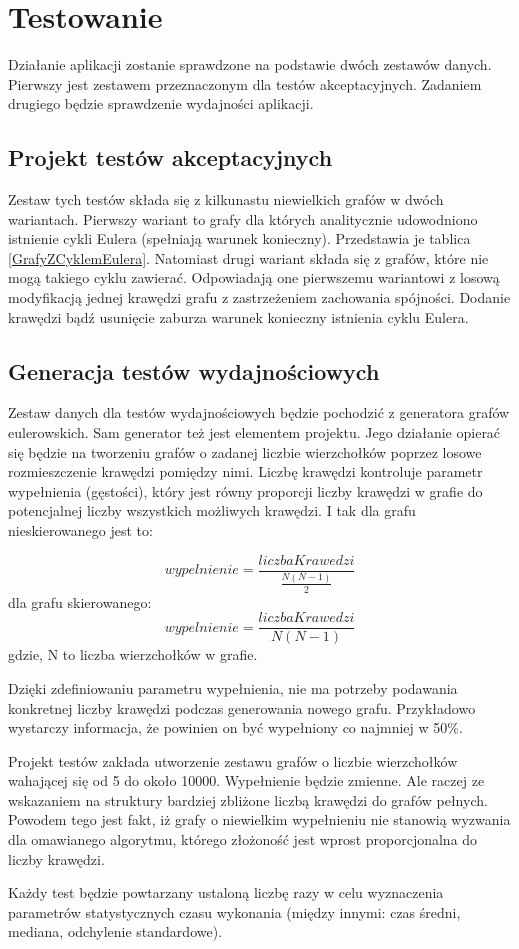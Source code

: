 \section{Testowanie}

Działanie aplikacji zostanie sprawdzone na podstawie dwóch zestawów danych.
Pierwszy jest zestawem przeznaczonym dla testów akceptacyjnych.
Zadaniem drugiego będzie sprawdzenie wydajności aplikacji. 

\subsection{Projekt testów akceptacyjnych}

Zestaw tych testów składa się z kilkunastu niewielkich grafów w dwóch wariantach.
Pierwszy wariant to grafy dla których analitycznie udowodniono istnienie cykli Eulera (spełniają warunek konieczny). Przedstawia je tablica \ref{GrafyZCyklemEulera}.
Natomiast drugi wariant składa się z grafów, które nie mogą takiego cyklu zawierać.
Odpowiadają one pierwszemu wariantowi z losową modyfikacją jednej krawędzi grafu z zastrzeżeniem zachowania spójności. Dodanie krawędzi bądź usunięcie zaburza warunek konieczny istnienia cyklu Eulera.

\subsection{Generacja testów wydajnościowych}

Zestaw danych dla testów wydajnościowych będzie pochodzić z generatora grafów eulerowskich.
Sam generator też jest elementem projektu. 
Jego działanie opierać się będzie na tworzeniu grafów o zadanej liczbie wierzchołków poprzez losowe rozmieszczenie krawędzi pomiędzy nimi.
Liczbę krawędzi kontroluje parametr wypełnienia (gęstości), który jest równy proporcji liczby krawędzi w grafie do potencjalnej liczby wszystkich możliwych krawędzi. I tak dla grafu nieskierowanego jest to:

\[ 
wypelnienie = \frac{liczbaKrawedzi}{\frac{N(N-1)}{2}}
\]
dla grafu skierowanego:
\[ 
wypelnienie = \frac{liczbaKrawedzi}{N(N-1)}
\]
gdzie, N to liczba wierzchołków w grafie.

Dzięki zdefiniowaniu parametru wypełnienia, nie ma potrzeby podawania konkretnej liczby krawędzi podczas generowania nowego grafu. Przykładowo wystarczy informacja, że powinien on być wypełniony co najmniej w 50\%.

Projekt testów zakłada utworzenie zestawu grafów o liczbie wierzchołków wahającej się od 5 do około 10000.
Wypełnienie będzie zmienne. Ale raczej ze wskazaniem na struktury bardziej zbliżone liczbą krawędzi do grafów pełnych.
Powodem tego jest fakt, iż grafy o niewielkim wypełnieniu nie stanowią wyzwania dla omawianego algorytmu, którego złożoność jest wprost proporcjonalna do liczby krawędzi.

Każdy test będzie powtarzany ustaloną liczbę razy w celu wyznaczenia parametrów statystycznych czasu wykonania (między innymi: czas średni, mediana, odchylenie standardowe).


